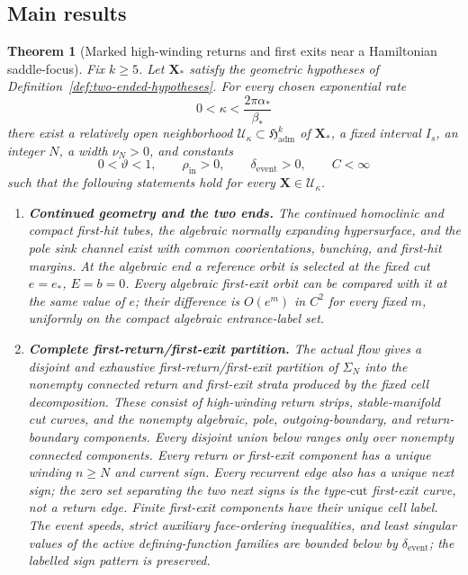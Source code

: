 \documentclass[11pt]{amsart}
\numberwithin{equation}{section}
\newtheorem{theorem}{Theorem}[section]
\theoremstyle{definition}
\theoremstyle{remark}
\newcommand{\cU}{\mathcal U}
\begin{document}
\subsection{Main results}

\begin{theorem}[Marked high-winding returns and first exits near a Hamiltonian
saddle-focus]
\label{thm:main}
Fix $k\ge5$.  Let $\mathbf X_*$ satisfy the geometric hypotheses of
Definition~\ref{def:two-ended-hypotheses}.
For every chosen exponential rate
\begin{equation}\label{eq:kappa-range}
 0<\kappa<\frac{2\pi\alpha_*}{\beta_*}
\end{equation}
there exist a relatively open neighborhood
$\cU_\kappa\subset\mathfrak H_{\mathrm{adm}}^k$ of $\mathbf X_*$, a
fixed interval $I_s$, an integer $N$, a width $\nu_N>0$, and constants
\begin{equation}\label{eq:uniform-margins}
 0<\vartheta<1,\qquad \rho_{\mathrm{in}}>0,\qquad
 \delta_{\mathrm{event}}>0,\qquad C<\infty
\end{equation}
such that the following statements hold for every
$\mathbf X\in\cU_\kappa$.

\begin{enumerate}
\renewcommand{\labelenumi}{\textup{(\roman{enumi})}}
\item \textup{\textbf{Continued geometry and the two ends.}}
The continued homoclinic and compact first-hit tubes, the algebraic
normally expanding hypersurface, and the pole sink channel exist with common coorientations,
bunching, and first-hit margins.  At the algebraic end a reference orbit
is selected at the fixed cut $e=e_*$, $E=b=0$.  Every algebraic first-exit
orbit can be compared with it at the same value of $e$; their difference
is $O(e^m)$ in $C^2$ for every fixed $m$, uniformly on the compact
algebraic entrance-label set.

\item \textup{\textbf{Complete first-return/first-exit partition.}}
The actual flow gives a disjoint and exhaustive first-return/first-exit
partition of $\Sigma_N$ into the nonempty connected return and first-exit
strata produced by the fixed cell decomposition.  These consist of
high-winding return strips, stable-manifold cut curves, and the
nonempty algebraic, pole, outgoing-boundary, and return-boundary
components.  Every disjoint union below ranges only over nonempty
connected components.  Every return or first-exit component has a unique
winding $n\ge N$ and current sign.  Every recurrent edge also has a unique
next sign; the zero set separating the two next signs is the
type-$\mathrm{cut}$ first-exit curve, not a return edge.  Finite first-exit
components have their unique cell label.  The event speeds, strict
auxiliary face-ordering inequalities, and least singular values of the
active defining-function families are bounded below by
$\delta_{\mathrm{event}}$; the labelled sign pattern is preserved.


\end{enumerate}
\end{theorem}
\end{document}
